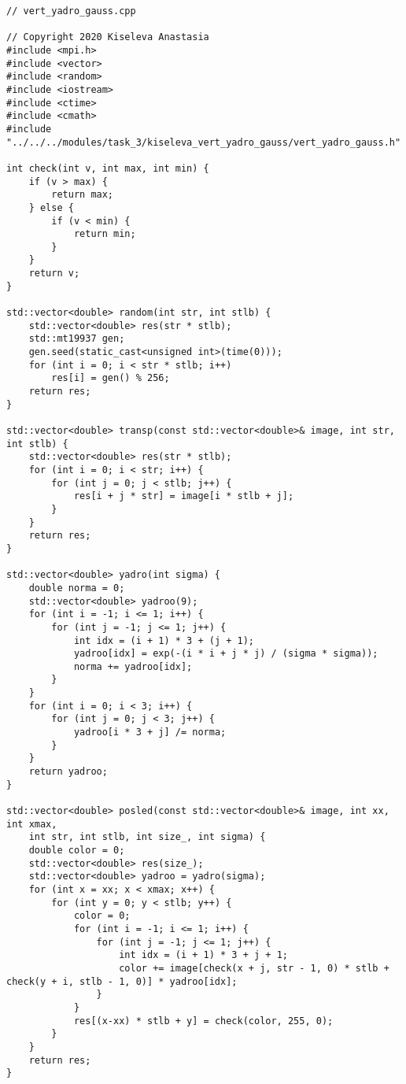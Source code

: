 \documentclass{report}
\begin{document}
\begin{lstlisting}
// vert_yadro_gauss.cpp

// Copyright 2020 Kiseleva Anastasia
#include <mpi.h>
#include <vector>
#include <random>
#include <iostream>
#include <ctime>
#include <cmath>
#include "../../../modules/task_3/kiseleva_vert_yadro_gauss/vert_yadro_gauss.h"

int check(int v, int max, int min) {
    if (v > max) {
        return max;
    } else {
        if (v < min) {
            return min;
        }
    }
    return v;
}

std::vector<double> random(int str, int stlb) {
    std::vector<double> res(str * stlb);
    std::mt19937 gen;
    gen.seed(static_cast<unsigned int>(time(0)));
    for (int i = 0; i < str * stlb; i++)
        res[i] = gen() % 256;
    return res;
}

std::vector<double> transp(const std::vector<double>& image, int str, int stlb) {
    std::vector<double> res(str * stlb);
    for (int i = 0; i < str; i++) {
        for (int j = 0; j < stlb; j++) {
            res[i + j * str] = image[i * stlb + j];
        }
    }
    return res;
}

std::vector<double> yadro(int sigma) {
    double norma = 0;
    std::vector<double> yadroo(9);
    for (int i = -1; i <= 1; i++) {
        for (int j = -1; j <= 1; j++) {
            int idx = (i + 1) * 3 + (j + 1);
            yadroo[idx] = exp(-(i * i + j * j) / (sigma * sigma));
            norma += yadroo[idx];
        }
    }
    for (int i = 0; i < 3; i++) {
        for (int j = 0; j < 3; j++) {
            yadroo[i * 3 + j] /= norma;
        }
    }
    return yadroo;
}

std::vector<double> posled(const std::vector<double>& image, int xx, int xmax,
    int str, int stlb, int size_, int sigma) {
    double color = 0;
    std::vector<double> res(size_);
    std::vector<double> yadroo = yadro(sigma);
    for (int x = xx; x < xmax; x++) {
        for (int y = 0; y < stlb; y++) {
            color = 0;
            for (int i = -1; i <= 1; i++) {
                for (int j = -1; j <= 1; j++) {
                    int idx = (i + 1) * 3 + j + 1;
                    color += image[check(x + j, str - 1, 0) * stlb + check(y + i, stlb - 1, 0)] * yadroo[idx];
                }
            }
            res[(x-xx) * stlb + y] = check(color, 255, 0);
        }
    }
    return res;
}


\end{lstlisting}
\end{document}
